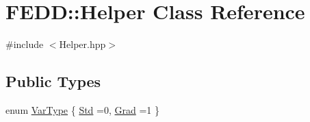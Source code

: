 \hypertarget{classFEDD_1_1Helper}{}\section{F\+E\+DD\+:\+:Helper Class Reference}
\label{classFEDD_1_1Helper}


{\ttfamily \#include $<$Helper.\+hpp$>$}

\subsection*{Public Types}
\begin{DoxyCompactItemize}
\item 
enum \hyperlink{classFEDD_1_1Helper_a9cb6017aaedca354e0402b8ff3b70844}{Var\+Type} \{ \hyperlink{classFEDD_1_1Helper_a9cb6017aaedca354e0402b8ff3b70844ad1258f74a7555232acfcffd74b5b0b6c}{Std} =0, 
\hyperlink{classFEDD_1_1Helper_a9cb6017aaedca354e0402b8ff3b70844a1b2c0b407eeb884b3d1f6e4cdbd354d5}{Grad} =1
 \}
\end{DoxyCompactItemize}
